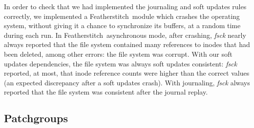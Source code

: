 \documentclass[9pt,twocolumn,letterpaper]{article}
\newcommand{\command}[1]{\emph{#1}}
\newcommand{\Kudos}{Featherstitch}
\newcommand{\Patchgroups}{Patchgroups}
\begin{document}
In order to check that we had implemented the journaling and soft updates
rules correctly,
we implemented a \Kudos\ module which crashes the operating system, without
giving it a chance to synchronize its buffers, at a random time during each
run.
%
In \Kudos\ asynchronous mode, after crashing, \command{fsck} nearly always reported
that the file system contained many references to inodes that had been
deleted, among other errors: the file system was corrupt.
%
With our soft updates dependencies, the file system was always soft
updates consistent: \command{fsck} reported, at most, that inode
reference counts were higher than the correct values (an expected
discrepancy after a soft updates crash).
%
With journaling, \command{fsck} always reported that the file system was
consistent after the journal replay.

\subsection {\Patchgroups}
\label{sec:evaluation:uwimap}

\end{document}

